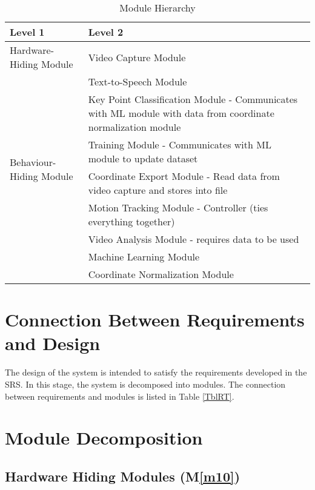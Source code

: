 \documentclass[12pt, titlepage]{article}
\newcommand{\mref}[1]{M\ref{#1}}
\begin{document}
\begin{table}[h!]
\centering
\begin{tabular}{p{} p{}}
\toprule
\textbf{Level 1} & \textbf{Level 2}\\
\midrule

{Hardware-Hiding Module} & Video Capture Module \\
\midrule

\multirow{7}{0.3\textwidth}{Behaviour-Hiding Module} & Text-to-Speech Module\\
& Key Point Classification Module - Communicates with ML module with data from coordinate normalization module\\
& Training Module - Communicates with ML module to update dataset\\
& Coordinate Export Module - Read data from video capture and stores into file\\
& Motion Tracking Module - Controller (ties everything together)\\

\midrule

\multirow{3}{0.3\textwidth}{Software Decision Module} & Video Analysis Module - requires data to be used\\
& Machine Learning Module\\
& Coordinate Normalization Module\\
\bottomrule


\end{tabular}
\caption{Module Hierarchy}
\label{TblMH}
\end{table}

\section{Connection Between Requirements and Design} \label{SecConnection}

The design of the system is intended to satisfy the requirements developed in
the SRS. In this stage, the system is decomposed into modules. The connection
between requirements and modules is listed in Table \ref{TblRT}.

\section{Module Decomposition} \label{SecMD}

\subsection{Hardware Hiding Modules (\mref{m10})}
\end{document}
